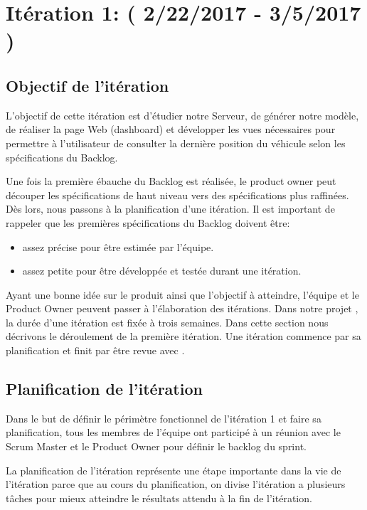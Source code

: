 \section{Itération 1: ( 2/22/2017 - 3/5/2017 )}

\subsection{Objectif de l'itération}

L'objectif de cette itération est d'étudier notre Serveur, de générer notre
modèle, de réaliser la page Web (dashboard) et développer les vues nécessaires
pour permettre à l'utilisateur de consulter la dernière position du véhicule
selon les spécifications du Backlog.

Une fois la première ébauche du Backlog est réalisée, le product owner peut
découper les spécifications de haut niveau vers des spécifications plus
raffinées. Dès lors, nous passons à la planification d'une itération. Il est
important de rappeler que les premières spécifications du Backlog doivent être:

\begin{itemize}
    \item assez précise pour être estimée par l'équipe.
    \item assez petite pour être développée et testée durant une itération.
\end{itemize}

Ayant une bonne idée sur le produit ainsi que l'objectif à atteindre, l'équipe
et le Product Owner peuvent passer à l'élaboration des itérations. Dans notre
projet , la durée d'une itération est fixée à
trois semaines. Dans cette section nous décrivons le déroulement de la première
itération. Une itération commence par sa planification et finit par être revue
avec .

\subsection{Planification de l'itération}

Dans le but de définir le périmètre fonctionnel de l'itération 1 et faire sa
planification, tous les membres de l'équipe ont participé à un réunion avec le
Scrum Master et le Product Owner pour définir le backlog du sprint.

La planification de l'itération représente une étape importante dans la vie de
l'itération parce que au cours du planification, on divise l'itération a
plusieurs tâches pour mieux atteindre le résultats attendu à la fin de
l'itération.

